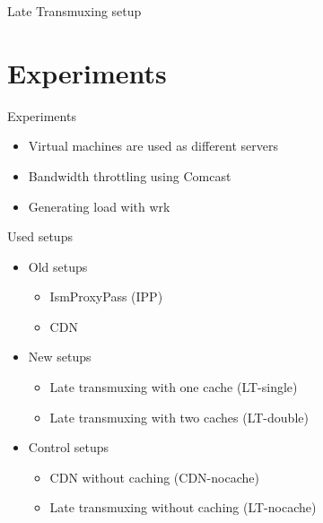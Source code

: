 \documentclass[xcolor=svgnames,handout]{beamer}
\begin{document}
\begin{frame}{Late Transmuxing setup}
    \begin{figure}

        \resizebox*{!}{\dimexpr\textheight-2\baselineskip\relax}{%
            
        }
    \end{figure}

\end{frame}


\section{Experiments}
\begin{frame}{Experiments}
    \begin{itemize}
        \item Virtual machines are used as different servers
        \item Bandwidth throttling using Comcast
        \item Generating load with wrk
    \end{itemize}
\end{frame}

\begin{frame}{Used setups}
    \begin{itemize}
        \item Old setups
            \begin{itemize}
                \item IsmProxyPass (IPP)
                \item CDN
            \end{itemize}

        \item New setups
            \begin{itemize}
                \item Late transmuxing with one cache (LT-single)
                \item Late transmuxing with two caches (LT-double)
            \end{itemize}
        \item Control setups
            \begin{itemize}
                \item CDN without caching (CDN-nocache)
                \item Late transmuxing without caching (LT-nocache)
            \end{itemize}
    \end{itemize}
\end{frame}
\end{document}
